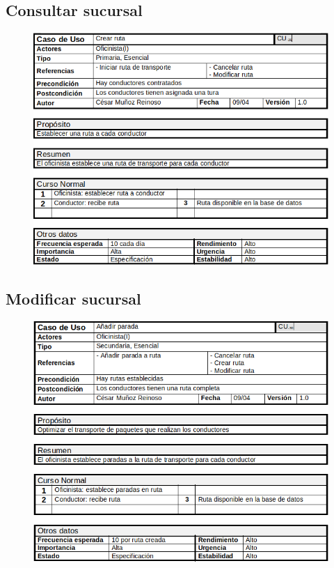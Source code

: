 \subsection{Consultar sucursal}
\begin{figure}[H]
	\centering
	\includegraphics[width=16cm]{7}
\end{figure}
\subsection{Modificar sucursal}
\begin{figure}[H]
	\centering
	\includegraphics[width=16cm]{8}
\end{figure}
